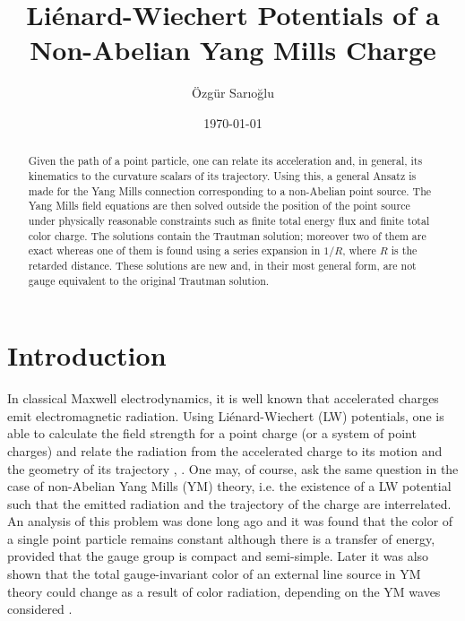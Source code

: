\documentclass[a4paper,twocolumn,prd,showpacs,amsmath,amssymb]{revtex4}
\begin{document}
\title{Li{\' e}nard-Wiechert Potentials of a Non-Abelian Yang Mills Charge}

\author{{\" O}zg{\" u}r Sar{\i}o\u{g}lu}

\date{\today}

\begin{abstract}
Given the path of a point particle, one can relate its acceleration
and, in general, its kinematics to the curvature scalars of its trajectory.
Using this, a general Ansatz is made for the Yang Mills connection
corresponding to a non-Abelian point source. The Yang Mills field
equations are then solved outside the position of the point source
under physically reasonable constraints such as finite total energy
flux and finite total color charge. The solutions contain the Trautman
solution; moreover two of them are exact whereas one of them is found
using a series expansion in $1/R$, where $R$ is the retarded distance.
These solutions are new and, in their most general form, are not gauge
equivalent to the original Trautman solution.
\end{abstract}


\maketitle

\section{\label{intro} Introduction}

In classical Maxwell electrodynamics, it is well known that accelerated charges
emit electromagnetic radiation. Using Li{\' e}nard-Wiechert (LW) potentials, one
is able to calculate the field strength for a point charge (or a system of point
charges) and relate the radiation from the accelerated charge to its motion and
the geometry of its trajectory \cite{bar}, \cite{jack}. One may, of course, ask
the same question in the case of non-Abelian Yang Mills (YM) theory, i.e. the
existence of a LW potential such that the emitted radiation and the trajectory
of the charge are interrelated. An analysis of this problem was done long ago
\cite{traut} and it was found that the color of a single point particle
remains constant although there is a transfer of energy, provided that the gauge
group is compact and semi-simple. Later it was also shown that the total gauge-invariant
color of an external line source in YM theory could change as a result of color
radiation, depending on the YM waves considered \cite{olt}.
\end{document}
